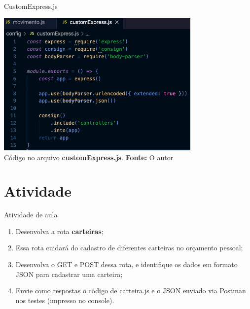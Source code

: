 \documentclass{beamer}
\begin{document}
    \begin{frame}{CustomExpress.js}
         \begin{center}
    	\includegraphics[width=100mm]{resources/aula5_3.png}\\
        \tiny{ Código no arquivo \textbf{customExpress.js}. \textbf{Fonte:} O autor}
     \end{center}   
    \end{frame}
  \section{Atividade}
  \begin{frame}{Atividade de aula}
   \begin{enumerate}
     \item Desenvolva a rota \textbf{carteiras};
     \item Essa rota cuidará do cadastro de diferentes carteiras no orçamento pessoal;
     \item Desenvolva o GET  e POST dessa rota, e identifique os dados em formato JSON para cadastrar uma carteira; 
     \item Envie como respostas o código de carteira.js e o JSON enviado via Postman nos testes (impresso no console).
   \end{enumerate}
  \end{frame}
%
%
  
\end{document}
